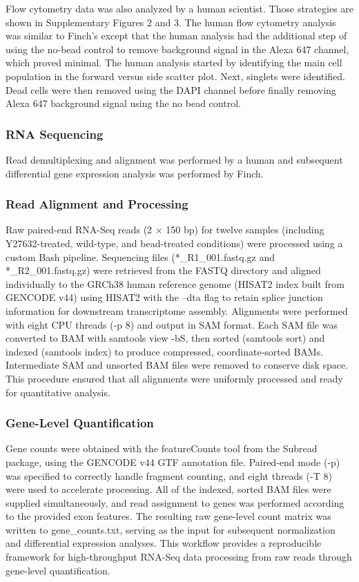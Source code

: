 \documentclass{article}
\begin{document}
Flow cytometry data was also analyzed by a human scientist. Those strategies are shown in Supplementary Figures 2 and 3. The human flow cytometry analysis was similar to Finch’s except that the human analysis had the additional step of using the no-bead control to remove background signal in the Alexa 647 channel, which proved minimal. The human analysis started by identifying the main cell population in the forward versus side scatter plot. Next, singlets were identified. Dead cells were then removed using the DAPI channel before finally removing Alexa 647 background signal using the no bead control. 

\subsubsection{RNA Sequencing}

Read demultiplexing and alignment was performed by a human and subsequent differential gene expression analysis was performed by Finch. 

\subsubsection{Read Alignment and Processing}

Raw paired-end RNA-Seq reads (2 × 150 bp) for twelve samples (including Y27632-treated, wild-type, and bead-treated conditions) were processed using a custom Bash pipeline. Sequencing files (*\_R1\_001.fastq.gz and *\_R2\_001.fastq.gz) were retrieved from the FASTQ directory and aligned individually to the GRCh38 human reference genome (HISAT2 index built from GENCODE v44) using HISAT2 with the --dta flag to retain splice junction information for downstream transcriptome assembly. Alignments were performed with eight CPU threads (-p 8) and output in SAM format. Each SAM file was converted to BAM with samtools view -bS, then sorted (samtools sort) and indexed (samtools index) to produce compressed, coordinate-sorted BAMs. Intermediate SAM and unsorted BAM files were removed to conserve disk space. This procedure ensured that all alignments were uniformly processed and ready for quantitative analysis.

\subsubsection{Gene-Level Quantification}

Gene counts were obtained with the featureCounts tool from the Subread package, using the GENCODE v44 GTF annotation file. Paired-end mode (-p) was specified to correctly handle fragment counting, and eight threads (-T 8) were used to accelerate processing. All of the indexed, sorted BAM files were supplied simultaneously, and read assignment to genes was performed according to the provided exon features. The resulting raw gene-level count matrix was written to gene\_counts.txt, serving as the input for subsequent normalization and differential expression analyses. This workflow provides a reproducible framework for high-throughput RNA-Seq data processing from raw reads through gene-level quantification.
\end{document}
